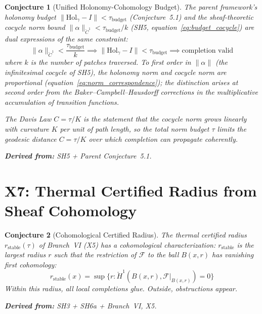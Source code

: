 \documentclass[11pt,letterpaper]{article}
\newtheorem{conjecture}{Conjecture}[section]
\newcommand{\Hol}{\mathrm{Hol}}
\newcommand{\tbudget}{\tau_{\mathrm{budget}}}
\newcommand{\Cech}{\check{C}}
\newcommand{\Hcech}{\check{H}}
\newcommand{\sheaf}{\mathcal{F}}
\begin{document}
\begin{conjecture}[Unified Holonomy-Cohomology 
Budget]\label{conj:x_budget}
The parent framework's holonomy budget $\|\Hol_\gamma - I\| < 
\tbudget$ (Conjecture~5.1) and the sheaf-theoretic cocycle norm bound 
$\|\alpha\|_{\Cech^1} < \tbudget / k$ (SH5, 
equation~\eqref{eq:budget_cocycle}) are \emph{dual expressions of the 
same constraint}:
\begin{equation}\label{eq:unified_budget}
    \|\alpha\|_{\Cech^1} < \frac{\tbudget}{k} 
    \implies \|\Hol_\gamma - I\| < \tbudget
    \implies \text{completion valid}
\end{equation}
where $k$ is the number of patches traversed. To first order in 
$\|\alpha\|$ (the infinitesimal cocycle of SH5), the holonomy norm 
and cocycle norm are proportional 
(equation~\eqref{eq:norm_correspondence}); the distinction arises 
at second order from the Baker--Campbell--Hausdorff corrections 
in the multiplicative accumulation of transition functions.

The Davis Law $C = \tau / K$ is the statement that the cocycle norm 
grows linearly with curvature $K$ per unit of path length, so the 
total norm budget $\tau$ limits the geodesic distance $C = \tau / K$ 
over which completion can propagate coherently.

\textbf{Derived from:} SH5 + Parent Conjecture~5.1.
\end{conjecture}

\section{X7: Thermal Certified Radius from Sheaf Cohomology}

\begin{conjecture}[Cohomological Certified 
Radius]\label{conj:x_certified}
The thermal certified radius $r_{\mathrm{stable}}(\tau)$ of 
Branch~VI (X5) has a cohomological characterization: 
$r_{\mathrm{stable}}$ is the largest radius $r$ such that the 
restriction of $\sheaf$ to the ball $B(x, r)$ has vanishing first 
cohomology:
\begin{equation}\label{eq:coh_radius}
    r_{\mathrm{stable}}(x) = \sup\{r : \Hcech^1(B(x,r), 
    \sheaf|_{B(x,r)}) = 0\}
\end{equation}
Within this radius, all local completions glue. Outside, 
obstructions appear.

\textbf{Derived from:} SH3 + SH6a + Branch~VI, X5.
\end{conjecture}
\end{document}
